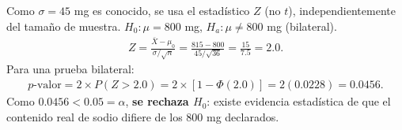 \begin{solproblema}
	Como $\sigma=45$ mg es conocido, se usa el estadístico $Z$ (no $t$), independientemente del tamaño de muestra. $H_0:\mu=800$ mg, $H_a:\mu\neq800$ mg (bilateral).
	\begin{align}
		Z = \frac{\bar{X}-\mu_0}{\sigma/\sqrt{n}} = \frac{815-800}{45/\sqrt{36}} = \frac{15}{7.5} = 2.0.
	\end{align}
	Para una prueba bilateral:
	\begin{align}
		p\text{-valor} = 2\times P(Z>2.0) = 2\times[1-\Phi(2.0)] = 2(0.0228) = 0.0456.
	\end{align}
	Como $0.0456 < 0.05 = \alpha$, \textbf{se rechaza $H_0$}: existe evidencia estadística de que el contenido real de sodio difiere de los 800 mg declarados.
\end{solproblema}
